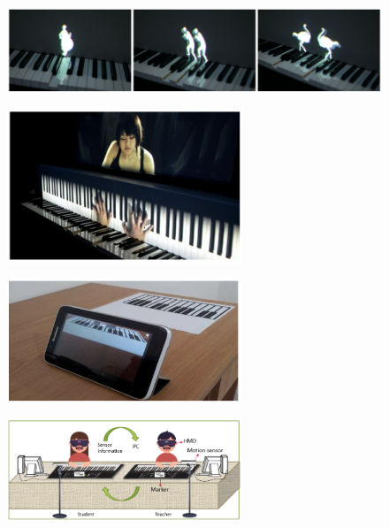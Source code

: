 \documentclass[manuscript,screen]{acmart}
\begin{document}
\begin{figure}
    \centering
    \includegraphics[width=15cm]{figures/xiaoandante.png}
    \caption{\cite{xiao2014andante} }
    \label{fig:View from the HeadMounted}
\end{figure}





\begin{figure}
    \centering
    \includegraphics[width=7cm]{figures/xiaomirrorfugue3.png}
    \caption{\cite{xiao2013mirrorfugue} }
    \label{fig:xiao2013mirror}
\end{figure}

\begin{figure}
    \centering
    \includegraphics[width=7cm]{figures/zaqoutfingerpiano.png}
    \caption{\cite{zaqout2015augmented} }
    \label{fig:zaqoutfingerpiano}
\end{figure}






\begin{figure}
    \centering
    \includegraphics[width=7cm]{figures/caigroup.png}
    \caption{\cite{cai2019designb} }
    \label{fig:caigroup}
\end{figure}




\end{document}
